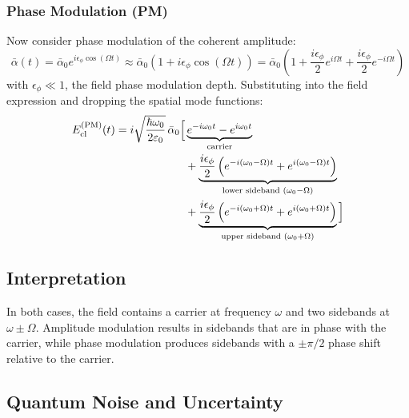\subsubsection*{Phase Modulation (PM)}
Now consider phase modulation of the coherent amplitude:
\begin{equation}
  \bar{\alpha}(t) = \bar{\alpha}_0 e^{i \epsilon_\phi \cos(\Omega t)}
  \approx \bar{\alpha}_0 \left(1 + i \epsilon_\phi \cos(\Omega t)\right)
  = \bar{\alpha}_0 \left(1 + \frac{i \epsilon_\phi}{2} e^{i\Omega t} + \frac{i \epsilon_\phi}{2} e^{-i\Omega t} \right)
\end{equation}
with $\epsilon_\phi \ll 1$, the field phase modulation depth. Substituting into the field expression and dropping the spatial mode functions:
\begin{align}
  E_{\text{cl}}^{\text{(PM)}}(t) =
  i \sqrt{\frac{\hbar \omega_0}{2 \varepsilon_0}}\, \bar{\alpha}_0 \Big[
  &\underbrace{e^{-i\omega_0 t} - e^{i\omega_0 t}}_{\text{carrier}} \notag \\
  &+ \underbrace{\frac{i \epsilon_\phi}{2} \left( e^{-i(\omega_0 - \Omega)t} + e^{i(\omega_0 - \Omega)t} \right)}_{\text{lower sideband } (\omega_0 - \Omega)} \notag \\
  &+ \underbrace{\frac{i \epsilon_\phi}{2} \left( e^{-i(\omega_0 + \Omega)t} + e^{i(\omega_0 + \Omega)t} \right)}_{\text{upper sideband } (\omega_0 + \Omega)}
  \Big]
\end{align}
\subsection*{Interpretation}
In both cases, the field contains a carrier at frequency $\omega$ and two sidebands at $\omega \pm \Omega$. Amplitude modulation results in sidebands that are in phase with the carrier, while phase modulation produces sidebands with a $\pm \pi/2$ phase shift relative to the carrier.
\subsection{Quantum Noise and Uncertainty}


